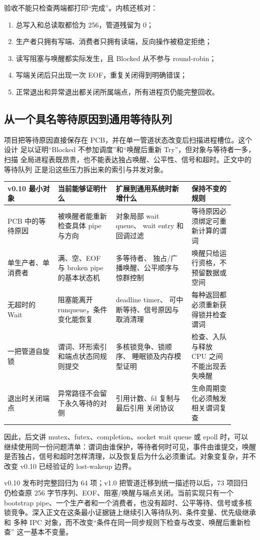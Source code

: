 验收不能只检查两端都打印“完成”。内核还核对：

\begin{enumerate}
\tightlist
\item 总写入和总读取都恰为 256，管道残留为 0；
\item 生产者只拥有写端、消费者只拥有读端，反向操作被稳定拒绝；
\item 读写阻塞与唤醒都实际发生，且 Blocked 从不参与 round-robin；
\item 写端关闭后只出现一次 EOF，重复关闭得到明确错误；
\item 正常退出和异常退出都关闭所属端点，所有进程页仍能完整回收。
\end{enumerate}

\subsection{从一个具名等待原因到通用等待队列}

项目把等待原因直接保存在 PCB，并在单一管道状态改变后扫描进程槽位。这个设计
足以证明“Blocked 不参加调度”和“唤醒后重新 Try”，但对象与等待者一多，扫描
全局进程表既昂贵，也不能表达独占唤醒、公平性、信号和超时。正文中的等待队列
正是沿这些压力拆出来的索引与并发对象。

\begin{longtable}{|L{0.20\linewidth}|L{0.23\linewidth}|L{0.30\linewidth}|L{0.17\linewidth}|}
\toprule
v0.10 最小对象 & 当前能够证明什么 & 扩展到通用系统时新增什么 & 保持不变的规则 \\
\midrule
\endhead
PCB 中的等待原因 & 被唤醒者能重新检查具体 pipe 与方向 & 对象局部 wait queue、
wait entry 和回调过滤 & 等待原因必须绑定可重新计算的谓词 \\\tablerowrule
单生产者、单消费者 & 满、空、EOF 与 broken pipe 的基本状态机 & 多等待者、
独占/广播唤醒、公平顺序与惊群控制 & 唤醒只给运行资格，不预留数据或空间 \\\tablerowrule
无超时的 Wait & 阻塞能离开 runqueue，条件变化能恢复 & deadline timer、
可中断等待、信号原因与取消清理 & 每种返回都必须重新获得锁并检查谓词 \\\tablerowrule
一把管道自旋锁 & 谓词、环形索引和端点状态同规则提交 & 多核锁竞争、锁顺序、
睡眠锁及内存模型证明 & 检查、入队与释放 CPU 之间不能出现丢失唤醒 \\\tablerowrule
退出时关闭端点 & 异常路径不会留下永久等待的对侧 & 引用计数、fd 复制与最后引用
关闭协议 & 生命周期变化必须触发相关谓词复查 \\
\bottomrule
\end{longtable}

因此，后文讲 mutex、futex、completion、socket wait queue 或 epoll 时，可以
继续使用同一份问题清单：谓词由谁保护，等待者何时可见，事件由谁提交，唤醒
是否独占，信号和超时怎样清理，以及恢复后为什么必须重试。对象变复杂，并不
改变 v0.10 已经验证的 lost-wakeup 边界。

v0.10 发布时完整回归为 64 项；v1.0 把管道迁移到统一描述符以后，73 项回归
仍检查原 256 字节序列、EOF、阻塞/唤醒与端点关闭。当前实现只有一个
bootstrap pipe、一个生产者和一个消费者，也没有超时、公平等待、信号或多核
锁竞争。深入正文在这条最小证据链上继续引入等待队列、条件变量、优先级继承和
多种 IPC 对象，而不改变“条件在同一同步规则下检查与改变、唤醒后重新检查”
这一基本不变量。
